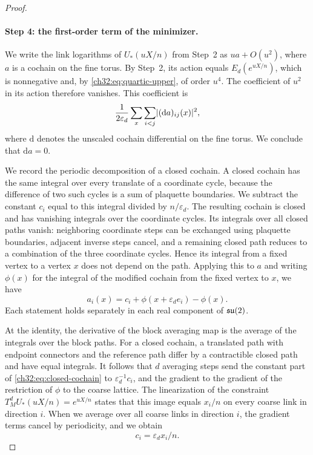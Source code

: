 \begin{proof}
\paragraph{Step 4: the first-order term of the minimizer.}
We write the link logarithms of $U_*(uX/n)$ from Step~2 as $ua+O(u^2)$, where $a$ is a cochain on the fine torus. By Step~2, its action equals $E_d(e^{uX/n})$, which is nonnegative and, by \eqref{ch32:eq:quartic-upper}, of order $u^4$. The coefficient of $u^2$ in its action therefore vanishes. This coefficient is
\[
 \frac1{2\varepsilon_d}\sum_x\sum_{i<j}\lvert (\mathrm da)_{ij}(x)\rvert^2,
\]
where $\mathrm d$ denotes the unscaled cochain differential on the fine torus. We conclude that $\mathrm da=0$.

We record the periodic decomposition of a closed cochain. A closed cochain has the same integral over every translate of a coordinate cycle, because the difference of two such cycles is a sum of plaquette boundaries. We subtract the constant $c_i$ equal to this integral divided by $n/\varepsilon_d$. The resulting cochain is closed and has vanishing integrals over the coordinate cycles. Its integrals over all closed paths vanish: neighboring coordinate steps can be exchanged using plaquette boundaries, adjacent inverse steps cancel, and a remaining closed path reduces to a combination of the three coordinate cycles. Hence its integral from a fixed vertex to a vertex $x$ does not depend on the path. Applying this to $a$ and writing $\phi(x)$ for the integral of the modified cochain from the fixed vertex to $x$, we have
\begin{equation}\label{ch32:eq:closed-cochain}
 a_i(x)=c_i+\phi(x+\varepsilon_de_i)-\phi(x).
\end{equation}
Each statement holds separately in each real component of $\mathfrak{su}(2)$.

At the identity, the derivative of the block averaging map is the average of the integrals over the block paths. For a closed cochain, a translated path with endpoint connectors and the reference path differ by a contractible closed path and have equal integrals. It follows that $d$ averaging steps send the constant part of \eqref{ch32:eq:closed-cochain} to $\varepsilon_d^{-1}c_i$, and the gradient to the gradient of the restriction of $\phi$ to the coarse lattice. The linearization of the constraint $T_M^dU_*(uX/n)=e^{uX/n}$ states that this image equals $x_i/n$ on every coarse link in direction $i$. When we average over all coarse links in direction $i$, the gradient terms cancel by periodicity, and we obtain
\begin{equation}\label{ch32:eq:harmonic-part}
 c_i=\varepsilon_dx_i/n.
\end{equation}


\end{proof}
